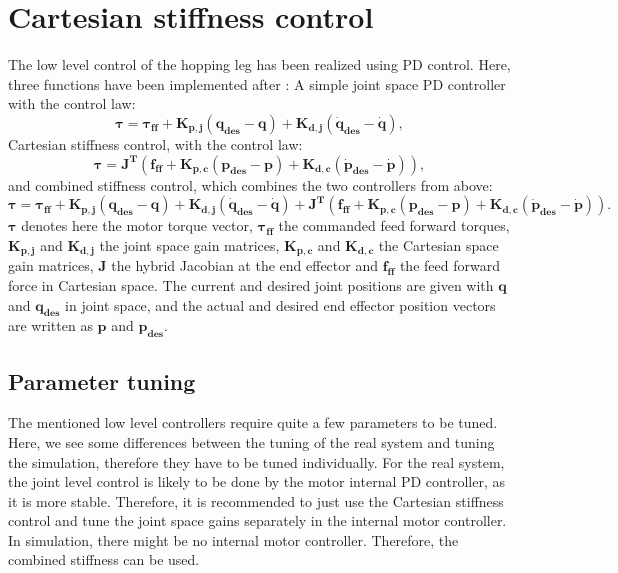 \documentclass[onecolumn, letter paper]{report}
\begin{document}
\flushbottom
\maketitle

\chapter{Cartesian stiffness control}
The low level control of the hopping leg has been realized using PD control. Here, three functions have been implemented after \cite{di2020software}: A simple joint space PD controller with the control law:
\begin{equation}
    \pmb{\tau } =\pmb{\tau_{ff}} + \pmb{K_{p,j}}(\pmb{q_{des}} - \pmb{q}) + \pmb{K_{d,j}}(\pmb{\dot q_{des}} - \pmb{\dot q} ),
\end{equation}
Cartesian stiffness control, with the control law: 
\begin{equation}
    \pmb{\tau} = \pmb{J^T} (\pmb{f_{ff}} + \pmb{K_{p,c}}(\pmb{p_{des}} - \pmb{p}) + \pmb{K_{d,c}}(\pmb{\dot p_{des}} - \pmb{\dot p} )),
\end{equation}
and combined stiffness control, which combines the two controllers from above:
\begin{equation}
    \pmb{\tau} = \pmb{\tau_{ff}} + \pmb{K_{p,j}}(\pmb{q_{des}} - \pmb{q}) + \pmb{K_{d,j}}(\pmb{\dot q_{des}} - \pmb{\dot q} ) + \pmb{J^T} (\pmb{f_{ff}} + \pmb{K_{p,c}}(\pmb{p_{des}} - \pmb{p}) + \pmb{K_{d,c}}(\pmb{\dot p_{des}} - \pmb{\dot p} )).
\end{equation}
$\pmb{\tau}$ denotes here the motor torque vector, $\pmb{\tau_{ff}}$ the commanded feed forward torques, $\pmb{K_{p,j}}$ and $\pmb{K_{d,j}}$ the joint space gain matrices, $\pmb{K_{p,c}}$ and $\pmb{K_{d,c}}$ the Cartesian space gain matrices, $\pmb{J}$ the hybrid Jacobian at the end effector and $\pmb{f_{ff}}$ the feed forward force in Cartesian space. The current and desired joint positions  are given with $\pmb{q}$ and $\pmb{q_{des}}$ in joint space, and the actual and desired end effector position vectors are written as $\pmb{p}$ and $\pmb{p_{des}}$. 

\section{Parameter tuning}
The mentioned low level controllers require quite a few parameters to be tuned. Here, we see some differences between the tuning of the real system and tuning the simulation, therefore they have to be tuned individually.
For the real system, the joint level control is likely to be done by the motor internal PD controller, as it is more stable. Therefore, it is recommended to just use the Cartesian stiffness control and tune the joint space gains separately in the internal motor controller. In simulation, there might be no internal motor  controller. Therefore, the combined stiffness can be used.
\end{document}
